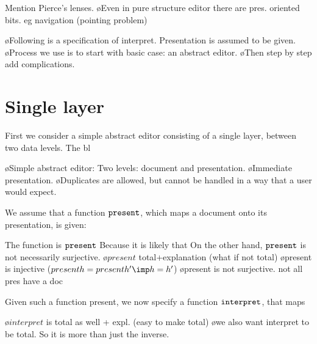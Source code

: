 Mention Pierce's lenses.
\bl
\o Even in pure structure editor there are pres. oriented bits. eg navigation (pointing problem)
\el

\bl
\o Following is a specification of interpret. Presentation is assumed to be given.
\o Process we use is to start with basic case: an abstract editor. 
\o Then step by step add complications.
\el




%																
%																
%																
\section{Single layer} \label{sect:singleSimple}

First we consider a simple abstract editor consisting of a single layer, between two data levels. The bl

\bl
\o Simple abstract editor: Two levels: document and presentation.
\o Immediate presentation.
\o Duplicates are allowed, but cannot be handled in a way that a user would expect.
\el


We assume that a function ${\tt present}$, which maps a document onto its presentation, is given:


The function is ${\tt present}$ Because it is likely that On the other hand, ${\tt present}$ is not necessarily surjective.
\bl
\o $present$ total+explanation (what if not total)
\o present is injective ($present h = present h' \imp h = h'$)
\o present is not surjective. not all pres have a doc
\el

Given such a function present, we now specify a function ${\tt interpret}$, that maps 


\bl
\o $interpret$ is total as well + expl. (easy to make total)
\o we also want interpret to be total. So it is more than just the inverse. 
\el

